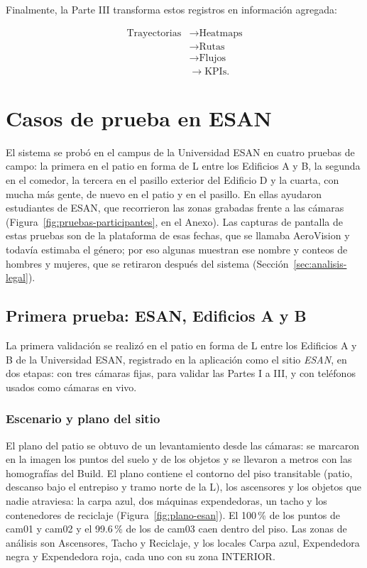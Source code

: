 \documentclass[12pt,a4paper]{article}
\begin{document}
Finalmente, la Parte III transforma estos registros en información
agregada:

\begin{equation}
\begin{aligned}
\text{Trayectorias}
&\rightarrow \text{Heatmaps}\\
&\rightarrow \text{Rutas}\\
&\rightarrow \text{Flujos}\\
&\rightarrow \text{KPIs}.
\end{aligned}
\end{equation}

\section{Casos de prueba en ESAN}
\label{sec:validacion-esan}

El sistema se probó en el campus de la Universidad ESAN en cuatro pruebas de campo: la primera en el patio en forma de L entre los Edificios A y B, la segunda en el comedor, la tercera en el pasillo exterior del Edificio D y la cuarta, con mucha más gente, de nuevo en el patio y en el pasillo. En ellas ayudaron estudiantes de ESAN, que recorrieron las zonas grabadas frente a las cámaras (Figura~\ref{fig:pruebas-participantes}, en el Anexo). Las capturas de pantalla de estas pruebas son de la plataforma de esas fechas, que se llamaba AeroVision y todavía estimaba el género; por eso algunas muestran ese nombre y conteos de hombres y mujeres, que se retiraron después del sistema (Sección~\ref{sec:analisis-legal}).

\subsection{Primera prueba: ESAN, Edificios A y B}

La primera validación se realizó en el patio en forma de L entre los
Edificios A y B de la Universidad ESAN, registrado en la aplicación como el
sitio \textit{ESAN}, en dos etapas: con tres cámaras fijas, para validar las
Partes I a III, y con teléfonos usados como cámaras en vivo.

\subsubsection{Escenario y plano del sitio}

El plano del patio se obtuvo de un levantamiento desde las cámaras: se
marcaron en la imagen los puntos del suelo y de los objetos y se llevaron a
metros con las homografías del Build. El plano contiene el contorno del piso
transitable (patio, descanso bajo el entrepiso y tramo norte de la L), los
ascensores y los objetos que nadie atraviesa: la carpa azul, dos máquinas
expendedoras, un tacho y los contenedores de reciclaje
(Figura~\ref{fig:plano-esan}). El 100\,\% de los puntos de cam01 y cam02 y el
99.6\,\% de los de cam03 caen dentro del piso. Las zonas de análisis son
Ascensores, Tacho y Reciclaje, y los locales Carpa azul, Expendedora negra y
Expendedora roja, cada uno con su zona INTERIOR.
\end{document}
